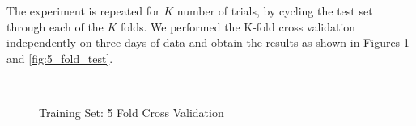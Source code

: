 \documentclass[conference]{IEEEtran.1.8}
\begin{document}
The experiment is repeated for $K$ number of trials, by cycling the test set through each of the $K$ folds. We performed the K-fold cross validation independently on three days of data and obtain the results as shown in Figures \ref{fig:5_fold_train} and \ref{fig:5_fold_test}. 
\begin{figure}[htb]
	\centering
	\\
	\caption{Training Set: 5 Fold Cross Validation}
	\label{fig:5_fold_train}
\end{figure}
\end{document}
